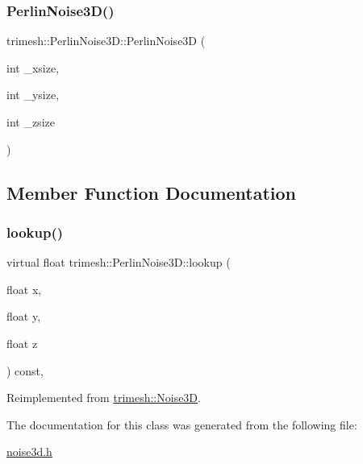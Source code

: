 \subsubsection{\texorpdfstring{Perlin\+Noise3\+D()}{PerlinNoise3D()}}
{\footnotesize\ttfamily trimesh\+::\+Perlin\+Noise3\+D\+::\+Perlin\+Noise3D (\begin{DoxyParamCaption}\item[{int}]{\+\_\+xsize,  }\item[{int}]{\+\_\+ysize,  }\item[{int}]{\+\_\+zsize }\end{DoxyParamCaption})\hspace{0.3cm}{\ttfamily [inline]}}



\subsection{Member Function Documentation}
\mbox{\label{classtrimesh_1_1PerlinNoise3D_a441ca024ab5b4da722c9d7edfbb98f33}} 
\subsubsection{\texorpdfstring{lookup()}{lookup()}}
{\footnotesize\ttfamily virtual float trimesh\+::\+Perlin\+Noise3\+D\+::lookup (\begin{DoxyParamCaption}\item[{float}]{x,  }\item[{float}]{y,  }\item[{float}]{z }\end{DoxyParamCaption}) const\hspace{0.3cm}{\ttfamily [inline]}, {\ttfamily [virtual]}}



Reimplemented from \hyperlink{classtrimesh_1_1Noise3D_a0e2a7259015f580e55b2d171986f0324}{trimesh\+::\+Noise3D}.



The documentation for this class was generated from the following file\+:\begin{DoxyCompactItemize}
\item 
\hyperlink{noise3d_8h}{noise3d.\+h}\end{DoxyCompactItemize}
